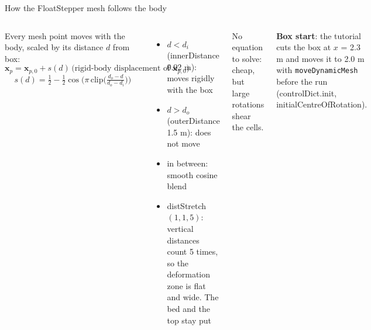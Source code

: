 \documentclass[aspectratio=169,10pt]{beamer}
\newcommand{\file}[1]{{\leavevmode\ttfamily\color{deep}#1}}
\newcommand{\key}[1]{{\leavevmode\ttfamily\color{sea}#1}}
\begin{document}
\begin{frame}{How the FloatStepper mesh follows the body}
  \begin{columns}[T]
    \small
    Every mesh point moves with the body, scaled by its distance $d$ from \key{box}:
    \[
      \mathbf{x}_p = \mathbf{x}_{p,0} + s(d)\,\big(\text{rigid-body displacement of }\mathbf{x}_{p,0}\big)
    \]
    \[
      s(d) = \tfrac12 - \tfrac12\cos\!\Big(\pi\,\mathrm{clip}\Big(\tfrac{d_o-d}{d_o-d_i}\Big)\Big)
    \]
    \begin{itemize}
      \item $d < d_i$ (\key{innerDistance} 0.02 m): moves rigidly with the box
      \item $d > d_o$ (\key{outerDistance} 1.5 m): does not move
      \item in between: smooth cosine blend
      \item \key{distStretch} $(1,1,5)$: vertical distances count 5 times, so the
            deformation zone is flat and wide. The bed and the top stay put
    \end{itemize}
    No equation to solve: cheap, but large rotations shear the cells.

    \small\textbf{Box start}: the tutorial cuts the box at $x$ = 2.3 m and moves it to 2.0 m with
    \texttt{moveDynamicMesh} before the run (\file{controlDict.init}, \key{initialCentreOfRotation}).
  \end{columns}
\end{frame}
\end{document}
